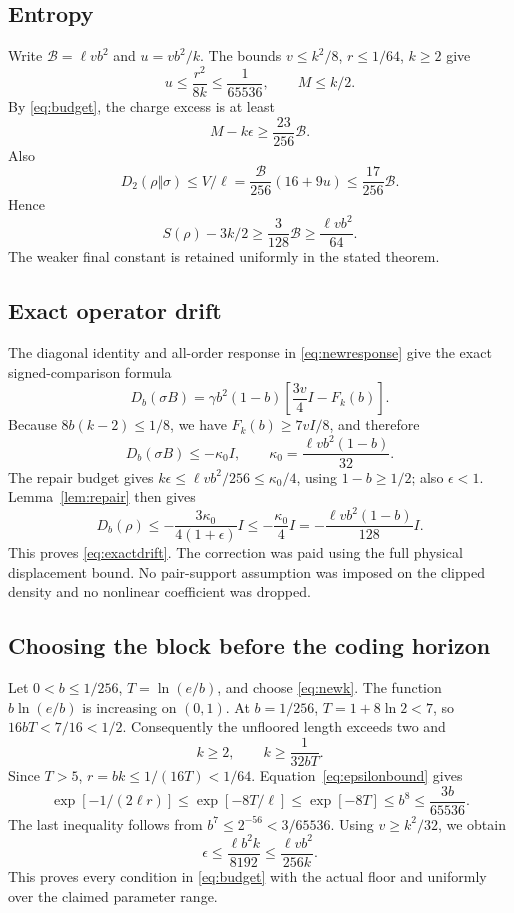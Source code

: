 \documentclass[11pt]{article}
\begin{document}
\subsection{Entropy}

Write \(\mathcal B=\ell vb^2\) and \(u=vb^2/k\).
The bounds \(v\le k^2/8\), \(r\le1/64\), \(k\ge2\) give
\[
 u\le\frac{r^2}{8k}\le\frac1{65536},\qquad M\le k/2.
\]
By \eqref{eq:budget}, the charge excess is at least
\[
 M-k\epsilon\ge \frac{23}{256}\mathcal B.
\]
Also
\[
 D_2(\rho\Vert\sigma)\le V/\ell
 =\frac{\mathcal B}{256}(16+9u)
 \le\frac{17}{256}\mathcal B.
\]
Hence
\[
 S(\rho)-3k/2\ge\frac{3}{128}\mathcal B
                  \ge\frac{\ell vb^2}{64}.
\]
The weaker final constant is retained uniformly in the stated theorem.

\subsection{Exact operator drift}

The diagonal identity and all-order response in \eqref{eq:newresponse}
give the exact signed-comparison formula
\[
 D_b(\sigma B)=
 \gamma b^2(1-b)\left[\frac{3v}{4}I-F_k(b)\right].
\]
Because \(8b(k-2)\le1/8\), we have \(F_k(b)\ge7vI/8\), and therefore
\[
 D_b(\sigma B)\le-\kappa_0 I,\qquad
 \kappa_0=\frac{\ell vb^2(1-b)}{32}.
\]
The repair budget gives \(k\epsilon\le\ell vb^2/256\le\kappa_0/4\),
using \(1-b\ge1/2\); also \(\epsilon<1\).
Lemma~\ref{lem:repair} then gives
\[
 D_b(\rho)\le-\frac{3\kappa_0}{4(1+\epsilon)}I
          \le-\frac{\kappa_0}{4}I
          =-\frac{\ell vb^2(1-b)}{128}I.
\]
This proves \eqref{eq:exactdrift}. The correction was paid using the
full physical displacement bound. No pair-support assumption was imposed
on the clipped density and no nonlinear coefficient was dropped.

\subsection{Choosing the block before the coding horizon}

Let \(0<b\le1/256\), \(T=\ln(e/b)\), and choose \eqref{eq:newk}.
The function \(b\ln(e/b)\) is increasing on \((0,1)\). At \(b=1/256\),
\(T=1+8\ln2<7\), so \(16bT<7/16<1/2\).
Consequently the unfloored length exceeds two and
\[
 k\ge2,\qquad k\ge\frac1{32bT}.
\]
Since \(T>5\), \(r=bk\le1/(16T)<1/64\).
Equation~\eqref{eq:epsilonbound} gives
\[
 \exp[-1/(2\ell r)]
 \le\exp[-8T/\ell]\le\exp[-8T]\le b^8
 \le\frac{3b}{65536}.
\]
The last inequality follows from \(b^7\le2^{-56}<3/65536\).
Using \(v\ge k^2/32\), we obtain
\[
 \epsilon\le\frac{\ell b^2 k}{8192}
             \le\frac{\ell vb^2}{256k}.
\]
This proves every condition in \eqref{eq:budget} with the actual floor
and uniformly over the claimed parameter range.
\end{document}
